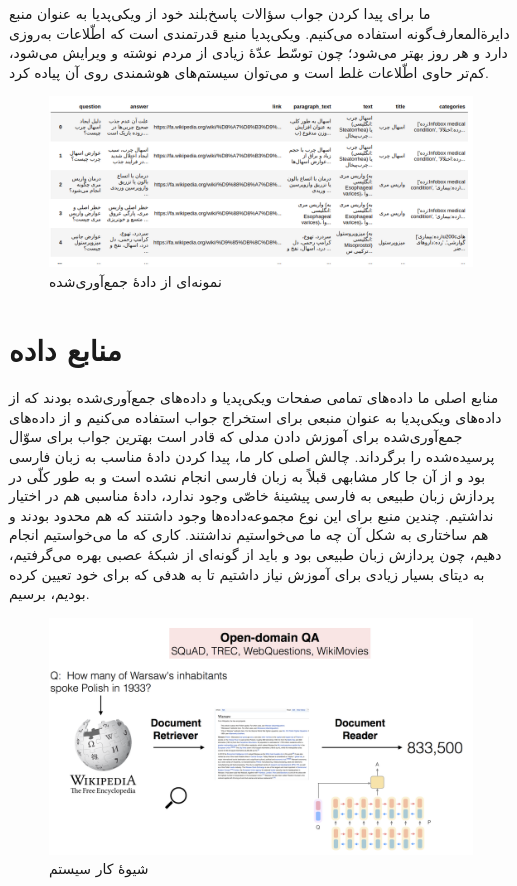 \documentclass{CCI2020}
\begin{document}
ما برای پیدا کردن جواب سؤالات پاسخ‌بلند خود از ویکی‌پدیا به عنوان منبع دایرة‌المعارف‌گونه استفاده می‌کنیم. ویکی‌پدیا منبع قدرتمندی است که اطّلاعات به‌روزی دارد و هر روز بهتر می‌شود؛ چون توسّط عدّهٔ زیادی از مردم نوشته و ویرایش می‌شود، کم‌تر حاوی اطّلاعات غلط است و می‌توان سیستم‌های هوشمندی روی آن پیاده کرد.



\begin{figure}[!htp]
    \centering
    \includegraphics[width=15cm]{images/data.png}
    \caption{نمونه‌ای از دادهٔ جمع‌آوری‌شده}
    \label{fig:data}
\end{figure}


\section{منابع داده}
منابع اصلی ما داده‌های تمامی صفحات ویکی‌پدیا و داده‌های جمع‌آوری‌شده بودند که از داده‌های ویکی‌پدیا به عنوان منبعی برای استخراج جواب استفاده می‌کنیم و از داده‌های جمع‌آوری‌شده برای آموزش دادن مدلی که قادر است بهترین جواب برای سوّال پرسیده‌شده را برگرداند.
چالش اصلی کار ما، پیدا کردن دادهٔ مناسب به زبان فارسی بود و از آن جا کار مشابهی قبلاً به زبان فارسی انجام نشده است و به طور کلّی در پردازش زبان طبیعی به فارسی پیشینهٔ خاصّی وجود ندارد، دادهٔ مناسبی هم در اختیار نداشتیم. چندین منبع برای این نوع مجموعه‌داده‌ها وجود داشتند که هم محدود بودند و هم ساختاری به شکل آن چه ما می‌خواستیم نداشتند. کاری که ما می‌خواستیم انجام دهیم، چون پردازش زبان طبیعی بود و باید از گونه‌ای از شبکهٔ عصبی بهره می‌گرفتیم، به دیتای بسیار زیادی برای آموزش نیاز داشتیم تا به هدفی که برای خود تعیین کرده بودیم، برسیم.

\begin{figure}[!htp]
    \centering
    \includegraphics[width=15cm]{images/drqa.png}
    \caption{شیوهٔ کار سیستم }
    \label{fig:drqa}
\end{figure}
\end{document}
